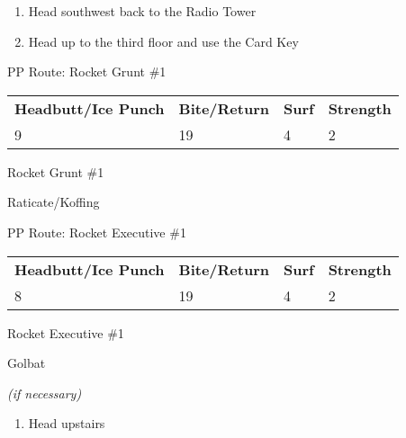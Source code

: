 \begin{paracol}{2}
\begin{enumerate}[resume]
	\item Head southwest back to the Radio Tower
	\item Head up to the third floor and use the Card Key 
\end{enumerate}

\switchcolumn*
\begin{misc}{PP Route: Rocket Grunt \#1}
	\varwb
	\begin{tabu} to \textwidth {X[6,c] X[5,c] X[4,c] X[4,c]}
		\textbf{Headbutt/Ice Punch} & \textbf{Bite/Return} & \textbf{Surf} & \textbf{Strength}\\ 
		9 & 19 & 4 & 2
	\end{tabu}
	\varwe
\end{misc}

\switchcolumn
\begin{trainer}{Rocket Grunt \#1}
	\varwb
	\begin{fightSection}{Raticate/Koffing}
		\item {} \icePunch{} 
	\end{fightSection}
	\varwe
\end{trainer}

\switchcolumn
\begin{misc}{PP Route: Rocket Executive \#1}
	\varwb
	\begin{tabu} to \textwidth {X[6,c] X[5,c] X[4,c] X[4,c]}
		\textbf{Headbutt/Ice Punch} & \textbf{Bite/Return} & \textbf{Surf} & \textbf{Strength}\\ 
		8 & 19 & 4 & 2
	\end{tabu}
	\varwe
\end{misc}

\switchcolumn
\begin{trainer}{Rocket Executive \#1}
	\varwb
	\begin{fightSection}{Golbat}
		\item {} \icePunch
		\begin{notes}
			\small{\item {} \return{} \textit{(if necessary)}}
		\end{notes}
	\end{fightSection}
	\varwe
\end{trainer}

\begin{enumerate}[resume]
	\item Head upstairs
\end{enumerate}


\end{paracol}

